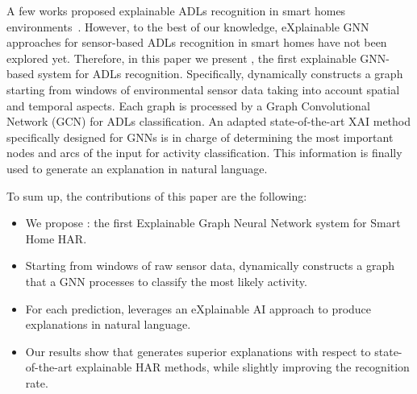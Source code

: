 A few works proposed explainable ADLs recognition in smart homes environments~\cite{arrotta2022dexar,das2023explainable}. However, to the best of our knowledge,  eXplainable GNN approaches for sensor-based ADLs recognition in smart homes have not been explored yet. Therefore, in this paper we present \acronym{}, the first explainable GNN-based system for ADLs recognition. Specifically, \acronym{} dynamically constructs a graph starting from windows of environmental sensor data taking into account spatial and temporal aspects. Each graph is processed by a Graph Convolutional Network (GCN) for ADLs classification. An adapted state-of-the-art XAI method specifically designed for GNNs is in charge of determining the most important nodes and arcs of the input for activity classification. This information is finally used to generate an explanation in natural language.

To sum up, the contributions of this paper are the following:

\begin{itemize}
    \item We propose \acronym{}: the first Explainable Graph Neural Network system for Smart Home HAR.
    \item Starting from windows of raw sensor data, \acronym{} dynamically constructs a graph that a GNN processes to classify the most likely activity.
    \item For each prediction, \acronym{} leverages an eXplainable AI approach to produce explanations in natural language. 
    \item Our results show that \acronym{} generates superior explanations with respect to state-of-the-art explainable HAR methods, while slightly improving the recognition rate.
\end{itemize}